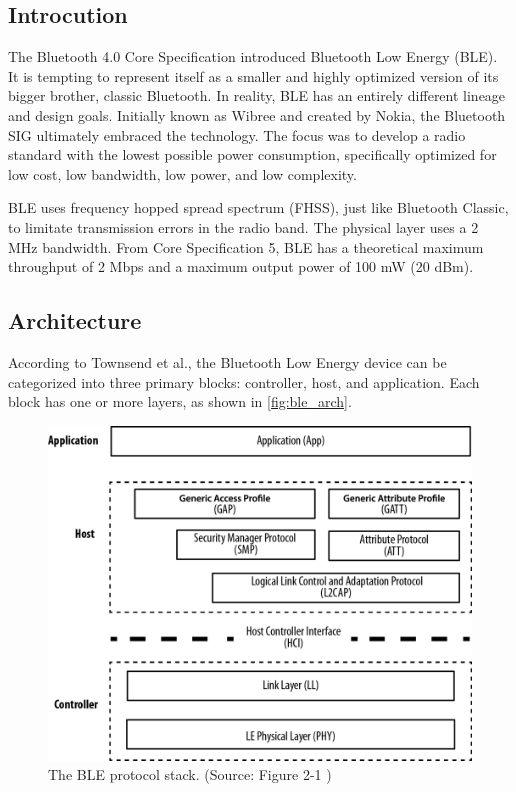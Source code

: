 \subsection{Introcution}
\label{ble:int}
The Bluetooth 4.0 Core Specification introduced Bluetooth Low Energy (BLE).
It is tempting to represent itself as a smaller and highly optimized version of
its bigger brother, classic Bluetooth. In reality, BLE has an entirely different lineage and design goals.
Initially known as Wibree and created by Nokia, the Bluetooth SIG ultimately embraced the technology.
The focus was to develop a radio standard with the lowest possible power consumption,
specifically optimized for low cost, low bandwidth, low power, and low complexity. \cite{Townsend14}

BLE uses frequency hopped spread spectrum (FHSS), just like Bluetooth Classic,
to limitate transmission errors in the radio band.
The physical layer uses a 2 MHz bandwidth.
From Core Specification 5, BLE has a theoretical maximum throughput of 2 Mbps and
a maximum output power of 100 mW (20 dBm).

\subsection{Architecture}
\label{ble:ow}

According to Townsend et al., the Bluetooth Low Energy device can be categorized into
three primary blocks: controller, host, and application.
Each block has one or more layers, as shown in \autoref{fig:ble_arch}.

\begin{figure}[!ht]
    \centering
    \includegraphics[width=150mm, keepaspectratio]{figures/ble_arch_from_townsend.png}
    \caption{The BLE protocol stack. (Source: Figure 2-1 \cite{Townsend14})}
    \label{fig:ble_arch}
\end{figure}

